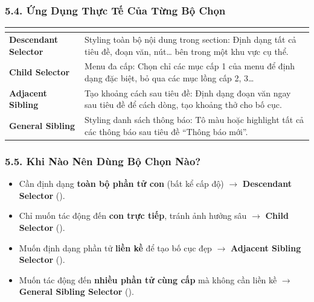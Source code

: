 \subsubsection{5.4. Ứng Dụng Thực Tế Của Từng Bộ Chọn}

\begin{prettyTableBox}
\sffamily\small
\begin{tabularx}{\linewidth}{|>{\bfseries\color{primaryBlue}}K{3.5cm}|Z|}
\hline
{}  &  \\
\hline
Descendant Selector \newline {} & Styling toàn bộ nội dung trong section: Định dạng tất cả tiêu đề, đoạn văn, nút\ldots{} bên trong một khu vực cụ thể. \\
\hline
Child Selector \newline {} & Menu đa cấp: Chọn chỉ các mục cấp 1 của menu để định dạng đặc biệt, bỏ qua các mục lồng cấp 2, 3\ldots{} \\
\hline
Adjacent Sibling \newline {} & Tạo khoảng cách sau tiêu đề: Định dạng đoạn văn ngay sau tiêu đề để cách dòng, tạo khoảng thở cho bố cục. \\
\hline
General Sibling \newline {} & Styling danh sách thông báo: Tô màu hoặc highlight tất cả các thông báo sau tiêu đề ``Thông báo mới''. \\
\hline
\end{tabularx}
\end{prettyTableBox}

\subsubsection{5.5. Khi Nào Nên Dùng Bộ Chọn Nào?}

\begin{tipBox}
\begin{itemize}[leftmargin=1.5em, itemsep=4pt, parsep=0pt]
    \item Cần định dạng \textbf{toàn bộ phần tử con} (bất kể cấp độ) $\rightarrow$ \textbf{Descendant Selector} ().
    \item Chỉ muốn tác động đến \textbf{con trực tiếp}, tránh ảnh hưởng sâu $\rightarrow$ \textbf{Child Selector} ().
    \item Muốn định dạng phần tử \textbf{liền kề} để tạo bố cục đẹp $\rightarrow$ \textbf{Adjacent Sibling Selector} ().
    \item Muốn tác động đến \textbf{nhiều phần tử cùng cấp} mà không cần liền kề $\rightarrow$ \textbf{General Sibling Selector} ().
\end{itemize}
\end{tipBox}


